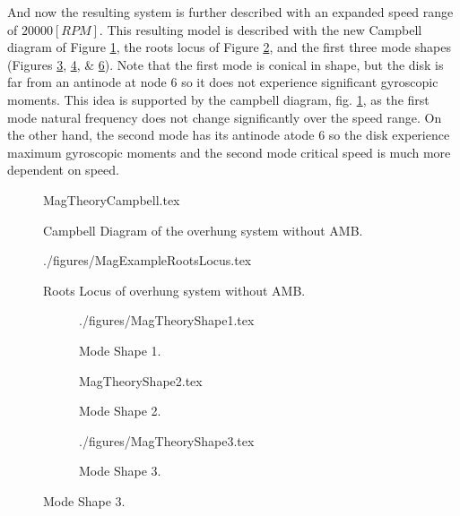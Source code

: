 And now the resulting system is further described with an expanded speed range of $ 20000[RPM] $. This resulting model is described with the new Campbell diagram of Figure \ref{fig:MagTheoryCampbell}, the roots locus of Figure \ref{fig:MagTheoryRootLocus}, and the first three mode shapes (Figures \ref{fig:MagTheoryShape1}, \ref{fig:MagTheoryShape2}, \& \ref{fig:MagTheoryShape3}). Note that the first mode is conical in shape, but the disk is far from an antinode at node 6 so it does not experience significant gyroscopic moments. This idea is supported by the campbell diagram, fig. \ref{fig:MagTheoryCampbell}, as the first mode natural frequency does not change significantly over the speed range. On the other hand, the second mode has its antinode atode 6 so the disk experience maximum gyroscopic moments and the second mode critical speed is much more dependent on speed.
\begin{figure}[!htb]
	\def\width{.6\linewidth}
	\def\height{.4\linewidth}
	\def\sep{3em}
	\centering
	{MagTheoryCampbell.tex}
	\caption{Campbell Diagram of the overhung system without AMB.}
	\label{fig:MagTheoryCampbell}
\end{figure}
\begin{figure}[!htb]
	\def\width{.6\linewidth}
	\def\height{.4\linewidth}
	\def\sep{3em}
	\centering
	{./figures/MagExampleRootsLocus.tex}
	\caption{Roots Locus of overhung system without AMB.}
	\label{fig:MagTheoryRootLocus}
\end{figure}
\begin{figure}
	\def\cs{.29}
	\begin{subfigure}{\cs\textwidth}
		\centering
		\def\width{\linewidth}
		\def\height{\linewidth}
		{./figures/MagTheoryShape1.tex}
		\caption{Mode Shape 1.}
		\label{fig:MagTheoryShape1}
	\end{subfigure}
	\begin{subfigure}{\cs\textwidth}
		\centering
		\def\width{\linewidth}
		\def\height{\linewidth}
		{MagTheoryShape2.tex}
		\caption{Mode Shape 2.}
		\label{fig:MagTheoryShape2}
	\end{subfigure}
	\begin{subfigure}{\cs\textwidth}
		\centering
		\def\width{\linewidth}
		\def\height{\linewidth}
		{./figures/MagTheoryShape3.tex}
		\caption{Mode Shape 3.}
		\label{fig:MagTheoryShape3}
	\end{subfigure}
\end{figure}
